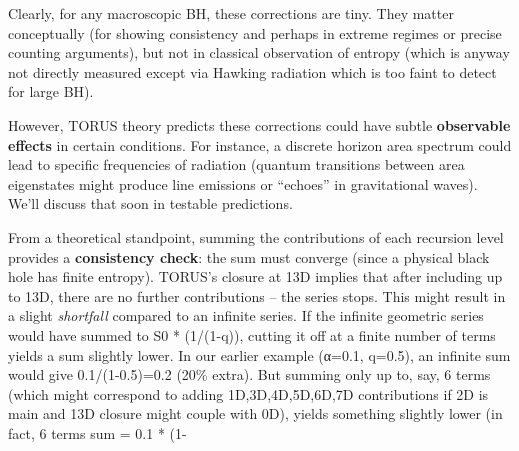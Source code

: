 \documentclass[]{article}
\begin{document}
Clearly, for any macroscopic BH, these corrections are tiny. They matter
conceptually (for showing consistency and perhaps in extreme regimes or
precise counting arguments), but not in classical observation of entropy
(which is anyway not directly measured except via Hawking radiation
which is too faint to detect for large BH).

However, TORUS theory predicts these corrections could have subtle
\textbf{observable effects} in certain conditions. For instance, a
discrete horizon area spectrum could lead to specific frequencies of
radiation (quantum transitions between area eigenstates might produce
line emissions or ``echoes'' in gravitational waves). We'll discuss that
soon in testable predictions.

From a theoretical standpoint, summing the contributions of each
recursion level provides a \textbf{consistency check}: the sum must
converge (since a physical black hole has finite entropy). TORUS's
closure at 13D implies that after including up to 13D, there are no
further contributions -- the series stops. This might result in a slight
\emph{shortfall} compared to an infinite series. If the infinite
geometric series would have summed to S0 * (1/(1-q)), cutting it off at
a finite number of terms yields a sum slightly lower. In our earlier
example (α=0.1, q=0.5), an infinite sum would give 0.1/(1-0.5)=0.2 (20\%
extra). But summing only up to, say, 6 terms (which might correspond to
adding 1D,3D,4D,5D,6D,7D contributions if 2D is main and 13D closure
might couple with 0D), yields something slightly lower (in fact, 6 terms
sum = 0.1 * (1-
\end{document}
